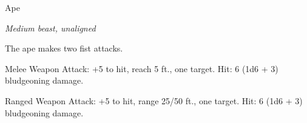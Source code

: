 \begin{monsterbox}{Ape}
\begin{hangingpar}
\textit{Medium beast, unaligned}
\end{hangingpar}
\dndline%
\basics[%
armorclass = 12,
hitpoints = 3d8 + 6,
speed = {30 ft., climb 30 ft.}
]
\dndline%
\stats[%
STR = \stat{16},
DEX = \stat{14},
CON = \stat{14},
INT = \stat{6},
WIS = \stat{12},
CHA = \stat{7}
]
\dndline%
\details[%
skills={Athletics +5, Perception +3, },
damageimmunities={},
savingthrows={},
conditionimmunities={},
damageresistances={},
damagevulnerabilities={},
senses={passive Perception 13},
challenge=1/2
]
\dndline%
\begin{monsteraction}[Multiattack]
The ape makes two fist attacks.
\end{monsteraction}
\begin{monsteraction}[Fist]
Melee Weapon Attack: +5 to hit, reach 5 ft., one target. Hit: 6 (1d6 + 3) bludgeoning damage.
\end{monsteraction}
\begin{monsteraction}[Rock]
Ranged Weapon Attack: +5 to hit, range 25/50 ft., one target. Hit: 6 (1d6 + 3) bludgeoning damage.
\end{monsteraction}
\end{monsterbox}